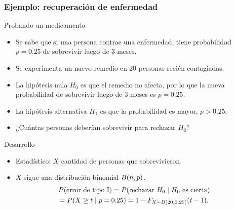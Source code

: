 \documentclass[table]{beamer}
\begin{document}
\begin{frame}
    \frametitle{Ejemplo: recuperación de enfermedad}
    \begin{exampleblock}{Probando un medicamento}
        \begin{itemize}
            \item Se sabe que si una persona contrae una enfermedad, tiene probabilidad $p = 0.25$ de sobrevivir luego de $3$ meses.
            \item Se experimenta un nuevo remedio en $20$ personas recién contagiadas.
            \item La hipótesis nula $H_{0}$ es que el remedio no afecta, por lo que la nueva probabilidad de sobrevivir luego de $3$ meses es $p = 0.25$.
            \item La hipótesis alternativa $H_{1}$ es que la probabilidad es mayor, $p > 0.25$.
            \item ¿Cuántas personas deberían sobrevivir para rechazar $H_{0}$?
        \end{itemize}
    \end{exampleblock}

\end{frame}

\begin{frame}
    \begin{block}{Desarrollo}
        \begin{itemize}
            \item Estadístico: $X$ cantidad de personas que sobrevivieron.
            \item $X$ sigue una distribución binomial $\binomial{n}{p}$.
                \begin{multline*}
                    \prob{\text{error de tipo I}} = \prob{\text{rechazar } H_{0} \mid H_{0} \text{ es cierta}}
                    \\
                    = \prob{X \geq t \mid p = 0.25} = 1 - \pFF{X \sim \binomial{20}{0.25}}{t - 1} .
                \end{multline*}
        \end{itemize}
    \end{block}
\end{frame}
\end{document}
